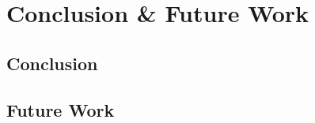 \chapter{Conclusion \& Future Work}\label{chapter:conclusion}

\section{Conclusion}
\section{Future Work}